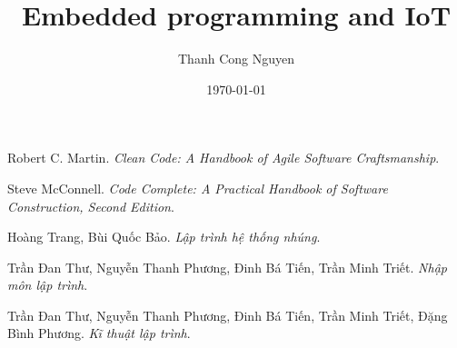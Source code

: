\documentclass[12pt,a5paper]{book}
\title{Embedded programming and IoT}
\date{\today}
\author{Thanh Cong Nguyen}
\begin{document}
\maketitle

\tableofcontents






\begin{thebibliography}{9}
Robert C. Martin. 
\textit{Clean Code: A Handbook of Agile Software Craftsmanship}. 
 
Steve McConnell.
\textit{Code Complete: A Practical Handbook of Software Construction, Second Edition}.

Hoàng Trang, Bùi Quốc Bảo.
\textit{Lập trình hệ thống nhúng}.

Trần Đan Thư, Nguyễn Thanh Phương, Đinh Bá Tiến, Trần Minh Triết.
\textit{Nhập môn lập trình}.

Trần Đan Thư, Nguyễn Thanh Phương, Đinh Bá Tiến, Trần Minh Triết, Đặng Bình Phương.
\textit{Kĩ thuật lập trình}.

\end{thebibliography}
\end{document}

